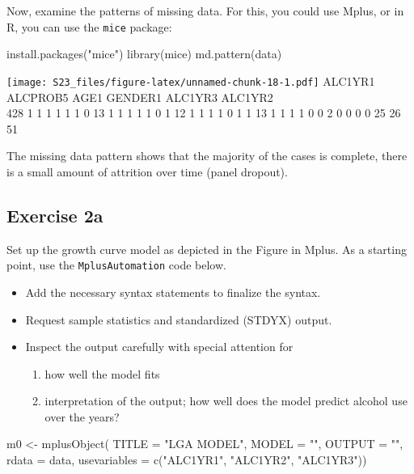 \documentclass[
]{book}
\newenvironment{Shaded}{\begin{snugshade}}{\end{snugshade}}
\newcommand{\AttributeTok}[1]{\textcolor[rgb]{0.77,0.63,0.00}{#1}}
\newcommand{\FunctionTok}[1]{\textcolor[rgb]{0.00,0.00,0.00}{#1}}
\newcommand{\NormalTok}[1]{#1}
\newcommand{\OtherTok}[1]{\textcolor[rgb]{0.56,0.35,0.01}{#1}}
\newcommand{\StringTok}[1]{\textcolor[rgb]{0.31,0.60,0.02}{#1}}
\providecommand{\tightlist}{%
  \setlength{\itemsep}{0pt}\setlength{\parskip}{0pt}}
\begin{document}
Now, examine the patterns of missing data. For this, you could use Mplus,
or in R, you can use the \texttt{mice} package:

\begin{Shaded}
\begin{Highlighting}[]
\FunctionTok{install.packages}\NormalTok{(}\StringTok{"mice"}\NormalTok{)}
\FunctionTok{library}\NormalTok{(mice)}
\FunctionTok{md.pattern}\NormalTok{(data)}
\end{Highlighting}
\end{Shaded}

\texttt{[image: S23\_files/figure-latex/unnamed-chunk-18-1.pdf]} ALC1YR1 ALCPROB5 AGE1 GENDER1 ALC1YR3 ALC1YR2\\
428 1 1 1 1 1 1 0
13 1 1 1 1 1 0 1
12 1 1 1 1 0 1 1
13 1 1 1 1 0 0 2
0 0 0 0 25 26 51

The missing data pattern shows that the majority of the cases is complete, there is a small amount of attrition over time (panel dropout).

\hypertarget{exercise-2a}{%
\subsection{Exercise 2a}\label{exercise-2a}}

Set up the growth curve model as depicted in the Figure in Mplus.
As a starting point, use the \texttt{MplusAutomation} code below.

\begin{itemize}
\tightlist
\item
  Add the necessary syntax statements to finalize the syntax.
\item
  Request sample statistics and standardized (STDYX) output.
\item
  Inspect the output carefully with special attention for

  \begin{enumerate}
  \def\labelenumi{\arabic{enumi}.}
  \tightlist
  \item
    how well the model fits
  \item
    interpretation of the output; how well does the model predict alcohol use over the
    years?
  \end{enumerate}
\end{itemize}

\begin{Shaded}
\begin{Highlighting}[]
\NormalTok{m0 }\OtherTok{\textless{}{-}} \FunctionTok{mplusObject}\NormalTok{(}
  \AttributeTok{TITLE =} \StringTok{"LGA MODEL"}\NormalTok{,}
  \AttributeTok{MODEL =} \StringTok{""}\NormalTok{,}
  \AttributeTok{OUTPUT =} \StringTok{""}\NormalTok{,}
  \AttributeTok{rdata =}\NormalTok{ data,}
  \AttributeTok{usevariables =} \FunctionTok{c}\NormalTok{(}\StringTok{"ALC1YR1"}\NormalTok{, }\StringTok{"ALC1YR2"}\NormalTok{, }\StringTok{"ALC1YR3"}\NormalTok{))}
\end{Highlighting}
\end{Shaded}
\end{document}
